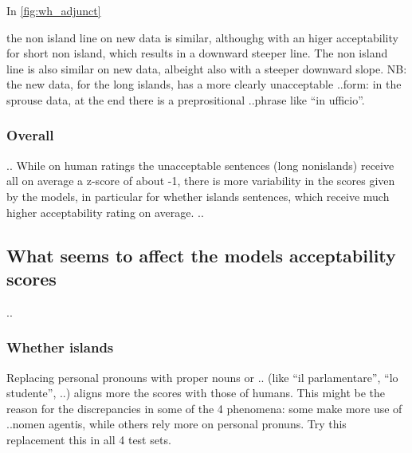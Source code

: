 In \autoref{fig:wh_adjunct}

the non island line on new data is similar, althoughg with an higer acceptability for short non island, which results in a downward steeper line. The non island line is also similar on new data, albeight also with a steeper downward slope.
NB: the new data, for the long islands, has a more clearly unacceptable ..form: in the sprouse data, at the end there is a preprositional ..phrase like “in ufficio”.

\subsubsection{Overall}
..
While on human ratings the unacceptable sentences (long nonislands) receive all on average a z-score of about -1, there is more variability in the scores given by the models, in particular for whether islands sentences, which receive much higher acceptability rating on average.
..







\subsection{What seems to affect the models acceptability scores}
..

\subsubsection{Whether islands}
Replacing personal pronouns with proper nouns or .. (like “il parlamentare”, “lo studente”, ..) aligns more the scores with those of humans.
This might be the reason for the discrepancies in some of the 4 phenomena: some make more use of ..nomen agentis, while others rely more on personal pronuns.
Try this replacement this in all 4 test sets.


